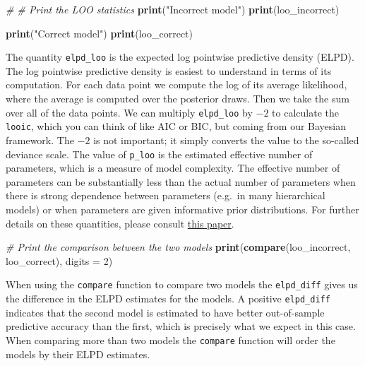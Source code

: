 \documentclass[]{book}
\newenvironment{Shaded}{\begin{snugshade}}{\end{snugshade}}
\newcommand{\KeywordTok}[1]{\textcolor[rgb]{0.13,0.29,0.53}{\textbf{{#1}}}}
\newcommand{\DataTypeTok}[1]{\textcolor[rgb]{0.13,0.29,0.53}{{#1}}}
\newcommand{\DecValTok}[1]{\textcolor[rgb]{0.00,0.00,0.81}{{#1}}}
\newcommand{\StringTok}[1]{\textcolor[rgb]{0.31,0.60,0.02}{{#1}}}
\newcommand{\CommentTok}[1]{\textcolor[rgb]{0.56,0.35,0.01}{\textit{{#1}}}}
\newcommand{\NormalTok}[1]{{#1}}
\begin{document}
\begin{Shaded}
\begin{Highlighting}[]
\CommentTok{# # Print the LOO statistics}
\KeywordTok{print}\NormalTok{(}\StringTok{"Incorrect model"}\NormalTok{)}
\KeywordTok{print}\NormalTok{(loo_incorrect)}
\end{Highlighting}
\end{Shaded}

\begin{Shaded}
\begin{Highlighting}[]
\KeywordTok{print}\NormalTok{(}\StringTok{"Correct model"}\NormalTok{)}
\KeywordTok{print}\NormalTok{(loo_correct)}
\end{Highlighting}
\end{Shaded}

The quantity \texttt{elpd\_loo} is the expected log pointwise predictive
density (ELPD). The log pointwise predictive density is easiest to
understand in terms of its computation. For each data point we compute
the log of its average likelihood, where the average is computed over
the posterior draws. Then we take the sum over all of the data points.
We can multiply \texttt{elpd\_loo} by \(-2\) to calculate the
\texttt{looic}, which you can think of like AIC or BIC, but coming from
our Bayesian framework. The \(-2\) is not important; it simply converts
the value to the so-called deviance scale. The value of \texttt{p\_loo}
is the estimated effective number of parameters, which is a measure of
model complexity. The effective number of parameters can be
substantially less than the actual number of parameters when there is
strong dependence between parameters (e.g.~in many hierarchical models)
or when parameters are given informative prior distributions. For
further details on these quantities, please consult
\href{http://arxiv.org/abs/1507.04544}{this paper}.

\begin{Shaded}
\begin{Highlighting}[]
\CommentTok{# Print the comparison between the two models}
\KeywordTok{print}\NormalTok{(}\KeywordTok{compare}\NormalTok{(loo_incorrect, loo_correct), }\DataTypeTok{digits =} \DecValTok{2}\NormalTok{)}
\end{Highlighting}
\end{Shaded}

When using the \texttt{compare} function to compare two models the
\texttt{elpd\_diff} gives us the difference in the ELPD estimates for
the models. A positive \texttt{elpd\_diff} indicates that the second
model is estimated to have better out-of-sample predictive accuracy than
the first, which is precisely what we expect in this case. When
comparing more than two models the \texttt{compare} function will order
the models by their ELPD estimates.
\end{document}
